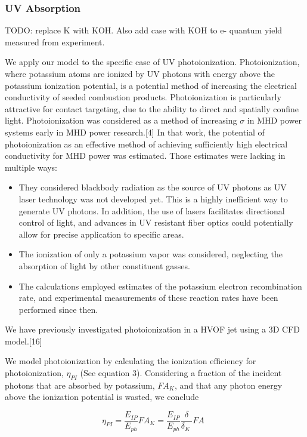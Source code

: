 \hypertarget{photoionization}{%
\subsubsection{UV Absorption}\label{photoionization}}

TODO: replace K with KOH. Also add case with KOH to e- quantum yield measured from experiment. 

We apply our model to the specific case of UV photoionization. Photoionization, where potassium atoms are ionized by UV photons with energy above the potassium ionization potential, is a potential method of increasing the electrical conductivity of seeded combustion products. Photoionization is particularly attractive for contact targeting, due to the ability to direct and spatially confine light. Photoionization was considered as a method of increasing \(\sigma\) in MHD power systems early in MHD power research.{[}4{]} In that work, the potential of photoionization as an effective method of achieving sufficiently high electrical conductivity for MHD power was estimated. Those estimates were lacking in multiple ways:

\begin{itemize}
\item
  They considered blackbody radiation as the source of UV photons as UV laser technology was not developed yet. This is a highly inefficient way to generate UV photons. In addition, the use of lasers facilitates directional control of light, and advances in UV resistant fiber optics could potentially allow for precise application to specific areas.
\item
  The ionization of only a potassium vapor was considered, neglecting the absorption of light by other constituent gasses.
\item
  The calculations employed estimates of the potassium electron recombination rate, and experimental measurements of these reaction rates have been performed since then.
\end{itemize}

We have previously investigated photoionization in a HVOF jet using a 3D CFD model.{[}16{]}

We model photoionization by calculating the ionization efficiency for photoionization, \(\eta_{PI}\) (See equation 3). Considering a fraction of the incident photons that are absorbed by potassium, \(FA_{K}\), and that any photon energy above the ionization potential is wasted, we conclude

\begin{equation}
\eta_{PI} = \frac{E_{IP}}{E_{ph}}FA_{K} = \frac{E_{IP}}{E_{ph}}\frac{\delta}{\delta_{K}\ }FA\ \ 
\end{equation}

